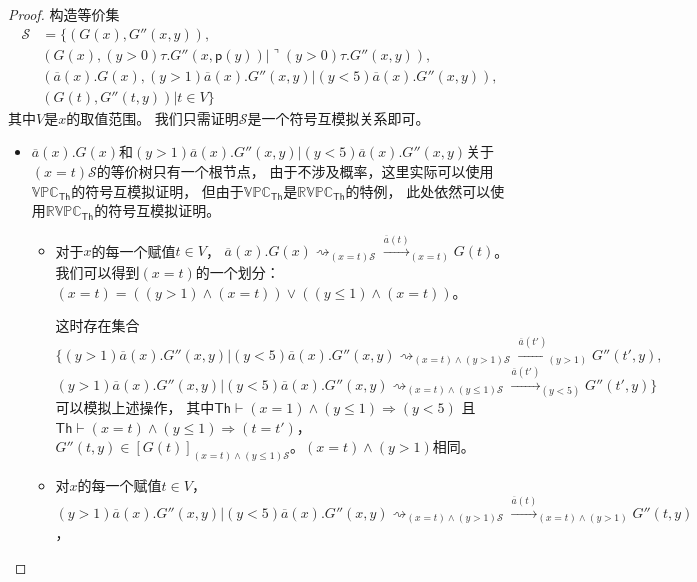 \begin{proof}
   构造等价集
   \begin{align*}
      \mathcal{S} &= \{(G(x),G''(x,y)),\\
      &(G(x),(y>0)\tau.G''(x,\mathsf{p}(y))|\urcorner (y>0)\tau.G''(x,y)),\\
      &(\overline{a}(x).G(x),(y>1)\overline{a}(x).G''(x,y)|(y<5)\overline{a}(x).G''(x,y)),\\
      &(G(t),G''(t,y))|t\in V\}
   \end{align*}
   其中$V$是$x$的取值范围。
   我们只需证明$\mathcal{S}$是一个符号互模拟关系即可。
   \begin{itemize}
      \item {
         $\overline{a}(x).G(x)$和$(y>1)\overline{a}(x).G''(x,y)|(y<5)\overline{a}(x).G''(x,y)$关于$(x=t)\mathcal{S}$的等价树只有一个根节点，
         由于不涉及概率，这里实际可以使用$\mathbb{VPC}_{\mathsf{Th}}$的符号互模拟证明，
         但由于$\mathbb{VPC}_{\mathsf{Th}}$是$\mathbb{RVPC}_{\mathsf{Th}}$的特例，
         此处依然可以使用$\mathbb{RVPC}_{\mathsf{Th}}$的符号互模拟证明。
         \begin{itemize}
            \item {
               对于$x$的每一个赋值$t\in V$，
               $\overline{a}(x).G(x)\rightsquigarrow_{(x=t)\mathcal{S}}\stackrel{\overline{a}(t)}{\longrightarrow}_{(x=t)}G(t)$。
               我们可以得到$(x=t)$的一个划分：$(x=t)=((y>1)\wedge (x=t))\vee ((y\leq 1)\wedge (x=t))$。
      
               这时存在集合
               $$\{(y>1)\overline{a}(x).G''(x,y)|(y<5)\overline{a}(x).G''(x,y)\rightsquigarrow_{(x=t)\wedge(y>1)\mathcal{S}}\stackrel{\overline{a}(t')}{\rightarrow}_{(y>1)}G''(t',y),$$
               $$(y>1)\overline{a}(x).G''(x,y)|(y<5)\overline{a}(x).G''(x,y)\rightsquigarrow_{(x=t)\wedge(y\leq 1)\mathcal{S}}\stackrel{\overline{a}(t')}{\rightarrow}_{(y<5)}G''(t',y)\}$$
               可以模拟上述操作，
               其中$\mathsf{Th}\vdash(x=1)\wedge(y\leq 1)\Rightarrow (y<5)$
               且$\mathsf{Th}\vdash (x=t)\wedge (y\leq 1)\Rightarrow (t=t')$，
               $G''(t,y)\in[G(t)]_{(x=t)\wedge(y\leq 1)\mathcal{S}}$。$(x=t)\wedge(y>1)$相同。
            }
            \item {
               对$x$的每一个赋值$t\in V$，
               $$(y>1)\overline{a}(x).G''(x,y)|(y<5)\overline{a}(x).G''(x,y)\rightsquigarrow_{(x=t)\wedge(y>1)\mathcal{S}}\stackrel{\overline{a}(t)}{\rightarrow}_{(x=t)\wedge(y>1)}G''(t,y)$$，
               
}
\end{itemize}}
\end{itemize}
\end{proof}
